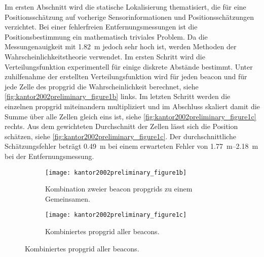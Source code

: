 Im ersten Abschnitt wird die statische Lokalisierung thematisiert, die für eine Positionsschätzung auf vorherige Sensorinformationen und Positionsschätzungen verzichtet. Bei einer fehlerfreien Entfernungsmessungen ist die Positionsbestimmung ein mathematisch triviales Problem. Da die Messungenauigkeit mit \SI{1.82}{\metre} jedoch sehr hoch ist, werden Methoden der Wahrscheinlichkeitstheorie verwendet. Im ersten Schritt wird die Verteilungsfunktion experimentell für einige diskrete Abstände bestimmt. Unter zuhilfenahme der erstellten Verteilungsfunktion wird für jeden \Gls{beacon} und für jede Zelle des \Gls{propgrid} die Wahrscheinlichkeit berechnet, siehe \autoref{fig:kantor2002preliminary_figure1b} links. Im letzten Schritt werden die einzelnen \Gls{propgrid} miteinandern multipliziert und im Abschluss skaliert damit die Summe über alle Zellen gleich eins ist, siehe \autoref{fig:kantor2002preliminary_figure1c} rechts. Aus dem gewichteten Durchschnitt der Zellen lässt sich die Position schätzen, siehe \autoref{fig:kantor2002preliminary_figure1c}. Der durchschnittliche Schätzungsfehler beträgt \SI{0.49}{\metre} bei einem erwarteten Fehler von \SIrange{1,77}{2,18}{\metre} bei der Entfernungsmessung.


\begin{figure}
  \begin{subfigure}{0.45\linewidth}
    \centering
    \texttt{[image: kantor2002preliminary\_figure1b]}
    \caption{Kombination zweier \Gls{beacon} \Glspl{propgrid} zu einem Gemeinsamen.}
    \label{fig:kantor2002preliminary_figure1b}
  \end{subfigure}
  \hfill
  \begin{subfigure}{0.45\linewidth}
    \centering
    \texttt{[image: kantor2002preliminary\_figure1c]}
    \caption{Kombiniertes \Gls{propgrid} aller \Glspl{beacon}.}
    \label{fig:kantor2002preliminary_figure1c}
  \end{subfigure}
\end{figure}

